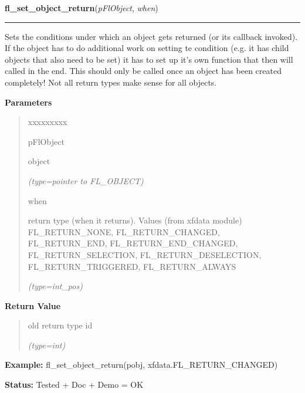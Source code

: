 \hspace{.8\funcindent}\begin{boxedminipage}{\funcwidth}

    \raggedright \textbf{fl\_set\_object\_return}(\textit{pFlObject}, \textit{when})

    \vspace{-1.5ex}

    \rule{\textwidth}{0.5\fboxrule}
\setlength{\parskip}{2ex}
    Sets the conditions under which an object gets returned (or its 
    callback invoked). If the object has to do additional work on setting 
    te condition (e.g. it has child objects that also need to be set) it 
    has to set up it's own function that then will called in the end. This 
    should only be called once an object has been created completely! Not 
    all return types make sense for all objects.

\setlength{\parskip}{1ex}
      \textbf{Parameters}
      \vspace{-1ex}

      \begin{quote}
        \begin{Ventry}{xxxxxxxxx}

          \item[pFlObject]

          object

            {\it (type=pointer to FL\_OBJECT)}

          \item[when]

          return type (when it returns). Values (from xfdata module) 
          FL\_RETURN\_NONE, FL\_RETURN\_CHANGED, FL\_RETURN\_END, 
          FL\_RETURN\_END\_CHANGED, FL\_RETURN\_SELECTION, 
          FL\_RETURN\_DESELECTION, FL\_RETURN\_TRIGGERED, 
          FL\_RETURN\_ALWAYS

            {\it (type=int\_pos)}

        \end{Ventry}

      \end{quote}

      \textbf{Return Value}
    \vspace{-1ex}

      \begin{quote}
      old return type id

      {\it (type=int)}

      \end{quote}

\textbf{Example:} fl\_set\_object\_return(pobj, xfdata.FL\_RETURN\_CHANGED)



\textbf{Status:} Tested + Doc + Demo = OK



    \end{boxedminipage}

